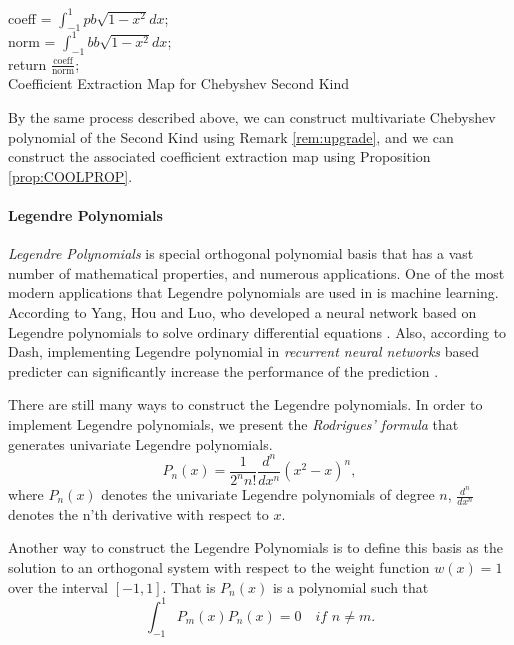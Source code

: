\documentclass[12pt]{amsart}
\numberwithin{equation}{section}
\theoremstyle{definition}
\numberwithin{thm}{section}
\begin{document}
\begin{algorithm}[H]
     \SetAlgoLined
     coeff = $\int_{-1}^1 pb\sqrt{1-x^2} dx$;\\
     norm = $\int_{-1}^1 bb\sqrt{1-x^2} dx$;\\
     return $\frac{\text{coeff}}{\text{norm}}$;\\
     \caption{Coefficient Extraction Map for Chebyshev Second Kind}
\end{algorithm}

By the same process described above, we can construct multivariate {Chebyshev polynomial of the Second Kind} using Remark \ref{rem:upgrade},
and we can construct the associated {coefficient extraction map} using Proposition \ref{prop:COOLPROP}.

\smallskip

\paragraph{Legendre Polynomials}
\emph{Legendre Polynomials} is special orthogonal polynomial basis that
has a vast number of mathematical properties, and numerous applications.
One of the most modern applications that {Legendre polynomials} are used in
is machine learning. According to Yang, Hou and Luo, who developed a neural
network based on {Legendre polynomials} to solve ordinary differential equations \cite{Yang2018}.
Also, according to Dash, implementing {Legendre polynomial} in \emph{recurrent neural networks} based predicter can
significantly increase the performance of the prediction \cite{DASH20201000}. 

There are still many ways to construct the {Legendre polynomials}. 
In order to implement {Legendre polynomials}, we present the \emph{Rodrigues' formula}
that generates univariate {Legendre polynomials}.
\begin{equation*}
     P_n(x) = \frac{1}{2^n n!} \frac{d^n}{dx^n} (x^2 - x)^n,
\end{equation*}
where $P_n(x)$ denotes the univariate {Legendre polynomials} of degree $n$,
$\frac{d^n}{dx^n}$ denotes the n'th derivative with respect to $x$. 

Another way to construct the {Legendre Polynomials} is to define this basis
as the solution to an orthogonal system with respect to the weight function 
$w(x)=1$ over the interval $[-1, 1]$. That is $P_n(x)$ is a polynomial such that
\begin{equation*}
     \int_{-1}^{1} P_m(x) P_n(x) = 0 \quad \textit{if } n \neq m.
\end{equation*}
\end{document}
